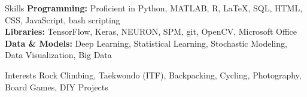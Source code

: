 \documentclass{resume}
\begin{document}
\vspace{1em}

    \begin{rSection}{Skills}
\textbf{Programming:} Proficient in Python, MATLAB, R, \LaTeX, SQL, HTML, CSS, JavaScript, bash scripting \\
\textbf{Libraries:} TensorFlow, Keras, NEURON, SPM, git, OpenCV, Microsoft Office \\
\textbf{Data \& Models:} Deep Learning, Statistical Learning, Stochastic Modeling, Data Visualization, Big Data \\
\end{rSection} 

\begin{rSection}{Interests}
Rock Climbing, Taekwondo (ITF), Backpacking, Cycling, Photography, Board Games, DIY Projects
\end{rSection} 



\end{document}
